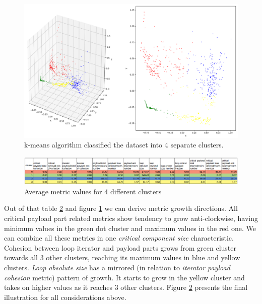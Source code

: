 \begin{figure}[H]
\centering
\includegraphics[width=\linewidth]{figs/metrics-4-clusters.png}
\caption{k-means algorithm classified the dataset into 4 separate clusters.}
\label{metrics-4-clusters}
\end{figure}
\begin{figure}[H]
\centering
\includegraphics[width=\linewidth]{figs/clusters-metric-values.png}
\caption{Average metric values for 4 different clusters}
\label{clusters-metric-values}
\end{figure} 
\null\qquad Out of that table \ref{clusters-metric-values} and figure \ref{metrics-4-clusters} we can derive metric growth directions. All critical payload part related metrics show tendency to grow anti-clockwise, having minimum values in the green dot cluster and maximum values in the red one. We can combine all these metrics in one \textit{critical component size} characteristic. Cohesion between loop iterator and payload parts grows from green cluster towards all 3 other clusters, reaching its maximum values in blue and yellow clusters. \textit{Loop absolute size} has a mirrored (in relation to \textit{iterator payload cohesion} metric) pattern of growth. It starts to grow in the yellow cluster and takes on higher values as it reaches 3 other clusters. Figure \ref{clusters-metric-values} presents the final illustration for all considerations above.\newline   
